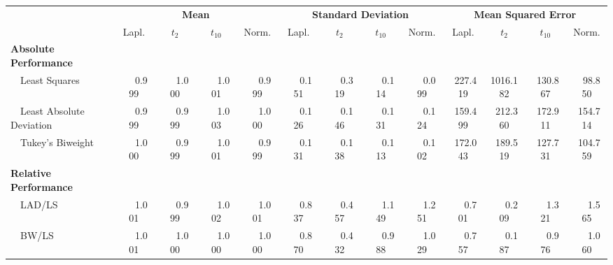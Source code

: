 %
\begin{center}
\begin{tabular}{|l||c|c|c|c||c|c|c|c||c|c|c|c|} \hline
\multicolumn{1}{|l||}{\bf }&\multicolumn{4}{c||}{\bf Mean}&\multicolumn{4}{c||}{\bf Standard Deviation}&\multicolumn{4}{c|}{\bf Mean Squared Error}\\ \cline{2-13}
\multicolumn{1}{|l||}{}&\multicolumn{1}{c|}{Lapl.}&\multicolumn{1}{c|}{$t_2$}&\multicolumn{1}{c|}{$t_{10}$}&\multicolumn{1}{c||}{Norm.}&\multicolumn{1}{c|}{Lapl.}&\multicolumn{1}{c|}{$t_2$}&\multicolumn{1}{c|}{$t_{10}$}&\multicolumn{1}{c||}{Norm.}&\multicolumn{1}{c|}{Lapl.}&\multicolumn{1}{c|}{$t_2$}&\multicolumn{1}{c|}{$t_{10}$}&\multicolumn{1}{c|}{Norm.}\\ \hline
{\bf Absolute Performance}&&&&&&&&&&&&\\
~~Least Squares&~~~0.999&~~~1.000&~~~1.001&~~~0.999&~~~0.151&~~~0.319&~~~0.114&~~~0.099&~227.419&1016.182&~130.867&~~98.850\\ 
~~Least Absolute Deviation&~~~0.999&~~~0.999&~~~1.003&~~~1.000&~~~0.126&~~~0.146&~~~0.131&~~~0.124&~159.499&~212.360&~172.911&~154.714\\ 
~~Tukey's Biweight&~~~1.000&~~~0.999&~~~1.001&~~~0.999&~~~0.131&~~~0.138&~~~0.113&~~~0.102&~172.043&~189.519&~127.731&~104.759\\ \hline
{\bf Relative Performance}&&&&&&&&&&&&\\
~~LAD/LS&~~~1.001&~~~0.999&~~~1.002&~~~1.001&~~~0.837&~~~0.457&~~~1.149&~~~1.251&~~~0.701&~~~0.209&~~~1.321&~~~1.565\\ 
~~BW/LS&~~~1.001&~~~1.000&~~~1.000&~~~1.000&~~~0.870&~~~0.432&~~~0.988&~~~1.029&~~~0.757&~~~0.187&~~~0.976&~~~1.060\\ 
\hline
\end{tabular}
\end{center}
